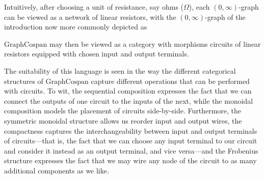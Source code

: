 Intuitively, after choosing a unit of resistance, say ohms ($\Omega$), each
$(0,\infty)$-graph can be viewed as a network of linear resistors, with the
$(0,\infty)$-graph of the introduction now more commonly depicted as
\begin{center}
\end{center}
$\mathrm{GraphCospan}$ may then be viewed as a category with morphisms
circuits of linear resistors equipped with chosen input and output terminals.

The suitability of this language is seen in the way the different categorical
structures of $\mathrm{GraphCospan}$ capture different operations that can be
performed with circuits. To wit, the sequential composition expresses the fact
that we can connect the outputs of one circuit to the inputs of the next, while
the monoidal composition models the placement of circuits side-by-side.
Furthermore, the symmetric monoidal structure allows us reorder input and output
wires, the compactness captures the interchangeability between input and
output terminals of circuits---that is, the fact that we can choose any input
terminal to our circuit and consider it instead as an output terminal, and vice
versa---and the Frobenius structure expresses the fact that we may wire any
node of the circuit to as many additional components as we like.

